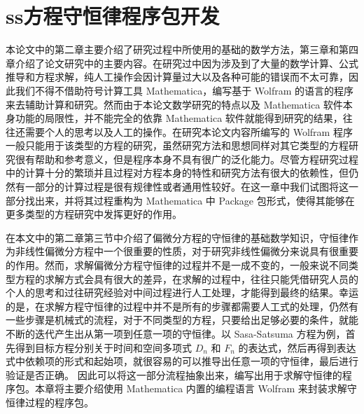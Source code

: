 
\chapter{ss方程守恒律程序包开发}
本论文中的第二章主要介绍了研究过程中所使用的基础的数学方法，第三章和第四章介绍了论文研究中的主要内容。在研究过中因为涉及到了大量的数学计算、公式推导和方程求解，纯人工操作会因计算量过大以及各种可能的错误而不太可靠，因此我们不得不借助符号计算工具 Mathematica，编写基于 Wolfram 的语言的程序来去辅助计算和研究。然而由于本论文数学研究的特点以及 Mathematica 软件本身功能的局限性，并不能完全的依靠 Mathematica 软件就能得到研究的结果，往往还需要个人的思考以及人工的操作。在研究本论文内容所编写的 Wolfram 程序一般只能用于该类型的方程的研究，虽然研究方法和思想同样对其它类型的方程研究很有帮助和参考意义，但是程序本身不具有很广的泛化能力。尽管方程研究过程中的计算十分的繁琐并且过程对方程本身的特性和研究方法有很大的依赖性，但仍然有一部分的计算过程是很有规律性或者通用性较好。在这一章中我们试图将这一部分找出来，并将其过程重构为 Mathematica 中 Package 包形式，使得其能够在更多类型的方程研究中发挥更好的作用。

在本文中的第二章第三节中介绍了偏微分方程的守恒律的基础数学知识，守恒律作为非线性偏微分方程中一个很重要的性质，对于研究非线性偏微分来说具有很重要的作用。然而，求解偏微分方程守恒律的过程并不是一成不变的，一般来说不同类型方程的求解方式会具有很大的差异，在求解的过程中，往往只能凭借研究人员的个人的思考和过往研究经验对中间过程进行人工处理，才能得到最终的结果。幸运的是，在求解方程守恒律的过程中并不是所有的步骤都需要人工式的处理，仍然有一些步骤是机械式的流程，对于不同类型的方程，只要给出足够必要的条件，就能不断的迭代产生出从第一项到任意一项的守恒律。以 Sasa-Satsuma 方程为例，首先得到目标方程分别关于时间和空间多项式 $D_n$ 和 $F_n$ 的表达式，然后再得到表达式中依赖项的形式和起始项，就很容易的可以推导出任意一项的守恒律，最后进行验证是否正确。 因此可以将这一部分流程抽象出来，编写出用于求解守恒律的程序包。本章将主要介绍使用 Mathematica 内置的编程语言 Wolfram 来封装求解守恒律过程的程序包。

